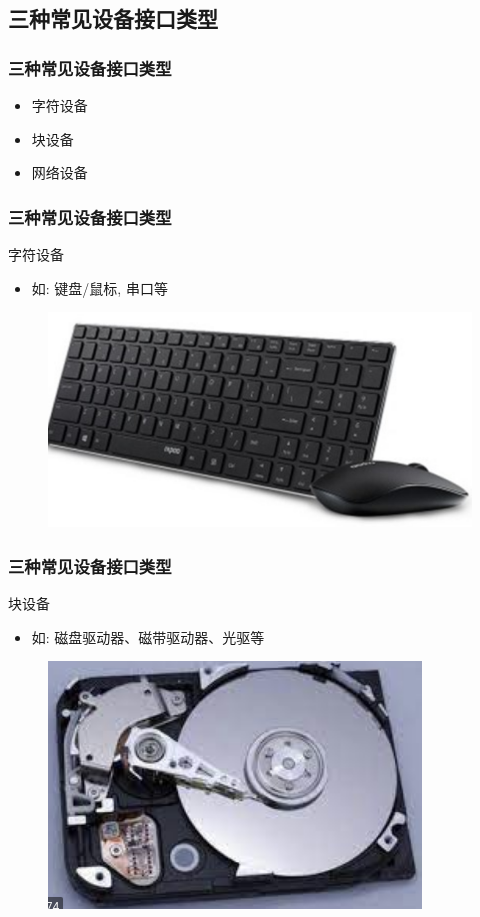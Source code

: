 \subsection{三种常见设备接口类型} %
\begin{frame}[fragile]
    \frametitle{三种常见设备接口类型}
    \begin{itemize}
    \item 字符设备
    \item 块设备
    \item 网络设备
    \end{itemize}
\end{frame}
% 
% 
% 
\begin{frame}[fragile]
    \frametitle{三种常见设备接口类型}
    字符设备
    \begin{itemize}
    \item 如: 键盘/鼠标, 串口等
    \end{itemize}
    \begin{figure}
    \includegraphics[width=0.47\linewidth]{figs/char-dev.png}
    \end{figure}
\end{frame}
% 
% 
\begin{frame}[fragile]
    \frametitle{三种常见设备接口类型}
    块设备
    \begin{itemize}
        \item 如: 磁盘驱动器、磁带驱动器、光驱等
    \end{itemize}
    \begin{figure}
        \includegraphics[width=0.47\linewidth]{figs/blk-dev.png}
    \end{figure}
\end{frame}
